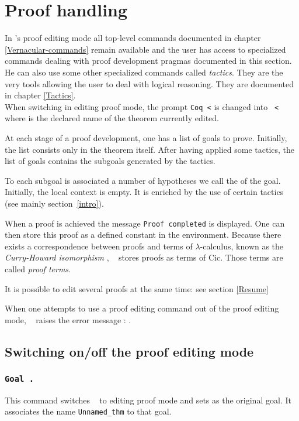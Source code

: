 \chapter{Proof handling}
\label{Proof-handling}

In \Coq's proof editing mode all top-level commands documented in 
chapter \ref{Vernacular-commands} remain available
and the user has access to specialized commands dealing with proof
development pragmas documented in this section. He can also use some
other specialized commands called {\em tactics}.  They are the very
tools allowing the user to deal with logical reasoning. They are
documented in chapter \ref{Tactics}.\\ 
When switching in editing proof mode, the prompt
{\tt Coq <} is changed into {\tt {\ident} <} where {\ident} is the
declared name of the theorem currently edited.

At each stage of a proof development, one has a list of goals to
prove. Initially, the list consists only in the theorem itself. After
having applied some tactics, the list of goals contains the subgoals
generated by the tactics.

To each subgoal is associated  a number of
hypotheses we call the {\em {}} of the goal.
Initially, the local context is empty. It is enriched by the use of
certain tactics (see mainly section~\ref{intro}).

When a proof is achieved the message {\tt Proof completed} is
displayed. One can then store this proof as a defined constant in the
environment. Because there exists a correspondence between proofs and
terms of $\lambda$-calculus, known as the {\em Curry-Howard
isomorphism} \cite{How80,Bar91,Gir89,Hue89}, \Coq~ stores proofs as
terms of {\sc Cic}. Those terms are called {\em proof
  terms}.

It is possible to edit several proofs at the same time: see section
\ref{Resume}

\ErrMsg When one attempts to use a proof editing command out of the
proof editing mode, \Coq~ raises the error message : .

\section{Switching on/off the proof editing mode}

\subsection{\tt Goal {\form}.}
\label{Goal}
This command switches \Coq~ to editing proof mode and sets {\form} as
the original goal. It associates the name {\tt Unnamed\_thm} to
that goal.

